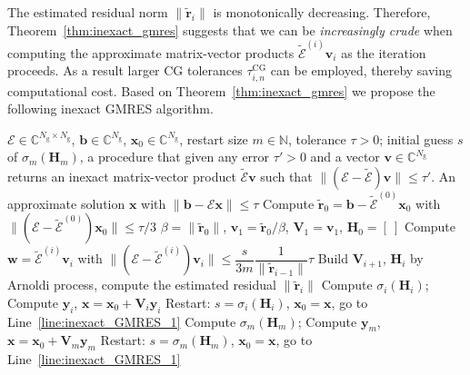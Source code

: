 \documentclass[hidelinks,onefignum,onetabnum]{siamart250211}
\newcommand{\C}{\mathbb{C}}
\newcommand{\N}{\mathbb{N}}
\newcommand{\Ng}{N_{\mathrm{g}}}
\newcommand{\taucg}{\tau^{\mathrm{CG}}}
\begin{document}
The estimated residual norm $\| \widetilde{\bm r}_i \|$ is monotonically decreasing.
Therefore, Theorem~\ref{thm:inexact_gmres} suggests that we can be
\emph{increasingly crude} when computing the approximate matrix-vector products
$\widetilde{\bm{\mathcal E}}^{(i)} \bm v_i$ as the iteration proceeds.
As a result larger CG tolerances $\taucg_{i,n}$ can be employed,
thereby saving computational cost.
%
%
%
%
Based on Theorem~\ref{thm:inexact_gmres}
we propose the following inexact GMRES algorithm.

\begin{algorithm}
  \caption{Inexact GMRES($m$)}\label{alg:inexact_gmres}
  \begin{algorithmic}[1]
  \Require $\bm{\mathcal E} \in \C^{\Ng\times \Ng}$, $\bm b \in \C^{\Ng}$, $\bm x_0 \in \C^{\Ng}$, restart size $m \in \N$, tolerance $\tau > 0$; initial guess $s$ of $\sigma_m(\bm H_m)$, a procedure that given any error $\tau' > 0$ and a vector $\bm v \in \C^{\Ng}$ returns an inexact matrix-vector product $\widetilde{\bm{\mathcal E}} \bm v$ such that $\| ( \bm{\mathcal E} - \widetilde{\bm{\mathcal E}} ) \bm v \| \leq \tau'$.
  \Ensure An approximate solution $\bm x$ with $\| \bm b - \bm{\mathcal E} \bm x \| \leq \tau$
  \State Compute $\widetilde{\bm r}_0 = \bm b - \widetilde{\bm{\mathcal E}}^{(0)} \bm x_0$ with $\| (\bm{\mathcal E} - \widetilde{\bm{\mathcal E}}^{(0)}) \bm x_0 \| \leq \tau/3$ \label{line:inexact_GMRES_1}
  \State $\beta = \| \widetilde{\bm r}_0 \|$, $\bm v_1 = \widetilde{\bm r}_0 / \beta$, $\bm V_1 = \bm v_1$, $\bm H_0 = [\ ]$ %
  \State Compute $\bm w = \widetilde{\bm{\mathcal E}}^{(i)} \bm v_i$ with $\| (\bm{\mathcal E} - \widetilde{\bm{\mathcal E}}^{(i)}) \bm v_i \| \leq \dfrac{s}{3m} \dfrac{1}{\|\widetilde{\bm r}_{i-1}\|}\tau$ \label{line:tau}
  \State Build $\bm V_{i+1}$, $\bm H_i$ by Arnoldi process, compute the estimated residual $\| \widetilde{\bm r}_i \|$
   \label{line:inexact_GMRES_termination}
  \State Compute $\sigma_i(\bm H_i)$; Compute $\bm y_i$, $\bm x = \bm x_0 + \bm V_i \bm y_i$
   \EndIIf
   Restart: $s = \sigma_i(\bm H_i)$, $\bm x_0 = \bm x$, go to Line~\ref{line:inexact_GMRES_1} \label{line:inexact_GMRES_s_update} \EndIIf
  \EndIf
  \EndFor
  \State Compute $\sigma_m(\bm H_m)$; Compute $\bm y_m$, $\bm x = \bm x_0 + \bm V_m \bm y_m$
  \State Restart: $s = \sigma_m(\bm H_m)$, $\bm x_0 = \bm x$, go to Line~\ref{line:inexact_GMRES_1} \label{line:inexact_GMRES_restart}
  \EndIf
  \end{algorithmic}
\end{algorithm}
\end{document}
